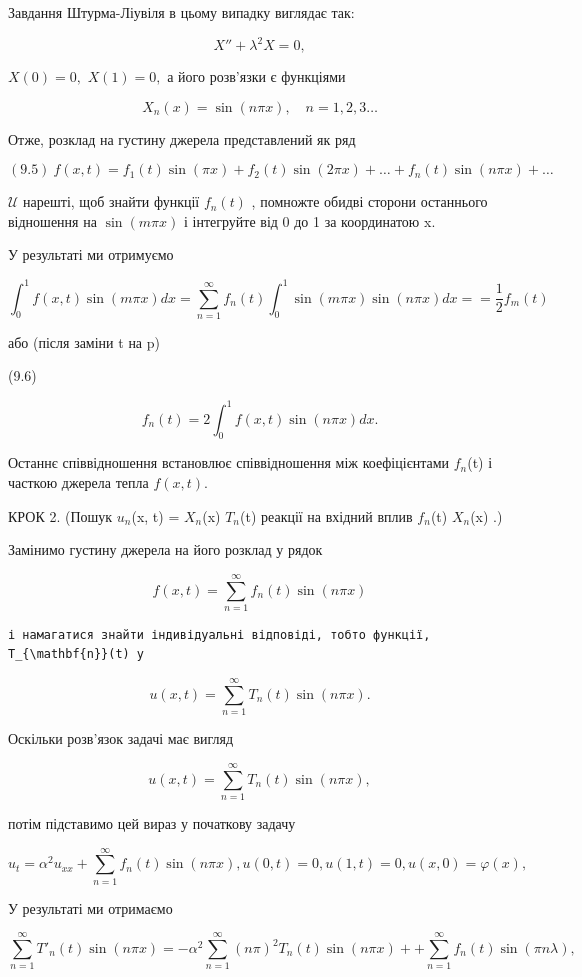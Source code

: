 \documentclass[
  ukrainian,
]{article}
\begin{document}
Завдання Штурма-Ліувіля в цьому випадку виглядає так:

\[
X'' + \lambda^2 X = 0,
\]

\(X(0) = 0,\) \(X(1) = 0,\) а його розв'язки є функціями

\[
X_n(x) = \sin(n\pi x), \quad n = 1, 2, 3 \dots
\]

Отже, розклад на густину джерела представлений як ряд

\[
(9.5) \ f(x,t) = f_1(t) \sin(\pi x) + f_2(t) \sin(2\pi x) + \dots + f_n(t) \sin(n\pi x) + \dots
\]

\(\mathcal{U}\) нарешті, щоб знайти функції \(f_n(t)\) , помножте обидві
сторони останнього відношення на \(\sin(m\pi x)\) і інтегруйте від 0 до
1 за координатою x.

У результаті ми отримуємо

\[
\int_{0}^{1} f(x, t) \sin(m\pi x) dx = \sum_{n=1}^{\infty} f_{n}(t) \int_{0}^{1} \sin(m\pi x) \sin(n\pi x) dx =
= \frac{1}{2} f_{m}(t)
\]

або (після заміни t на p)

(9.6)

\[
f_{n}(t) = 2 \int_{0}^{1} f(x, t) \sin(n\pi x) dx.
\]

Останнє співвідношення встановлює співвідношення між коефіцієнтами
\(f_n\)(t) і часткою джерела тепла \(f(x, t)\).

КРОК 2. (Пошук \(u_n\)(x, t) = \(X_n\)(x) \(T_n\)(t) реакції на вхідний
вплив \(f_n\)(t) \(X_n\)(x) .)

Замінимо густину джерела на його розклад у рядок

\[
f(x, t) = \sum_{n=1}^{\infty} f_n(t) \sin(n\pi x)
\]

\begin{verbatim}
і намагатися знайти індивідуальні відповіді, тобто функції, T_{\mathbf{n}}(t) у
\end{verbatim}

\[
u(x, t) = \sum_{n=1}^{\infty} T_n(t) \sin(n\pi x).
\]

Оскільки розв'язок задачі має вигляд

\[
u(x, t) = \sum_{n=1}^{\infty} T_n(t) \sin(n\pi x),
\]

потім підставимо цей вираз у початкову задачу

\[
u_{t} = \alpha^{2} u_{xx} + \sum_{n=1}^{\infty} f_{n}(t) \sin(n\pi x),
u(0, t) = 0,
u(1, t) = 0,
u(x, 0) = \varphi(x),
\]

У результаті ми отримаємо

\[
\sum_{n=1}^{\infty} T'_n(t) \sin(n\pi x) = -\alpha^2 \sum_{n=1}^{\infty} (n\pi)^2 T_n(t) \sin(n\pi x) + + \sum_{n=1}^{\infty} f_n(t) \sin(\pi n\lambda),
\]
\end{document}
